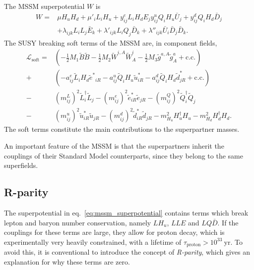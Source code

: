 \documentclass[twoside,english]{uiofysmaster}
\begin{document}
The MSSM superpotential $W$ is
\begin{align}
	W = &\mu H_u H_d + \mu'_i L_i H_u + y_{ij}^e L_i H_d E_j y_{ij}^u Q_i H_u \bar U_j + y_{ij}^d Q_i H_d \bar D_j \label{eq:mssm_superpotential} \\
		&+\lambda_{ijk}L_i L_j \bar E_k + \lambda'_{ijk} L_i Q_j \bar D_k + \lambda''_{ijk} \bar U_i \bar D_j \bar D_k.\nonumber
\end{align} 
The SUSY breaking soft terms of the MSSM are, in component fields,
\begin{align}
	\mathcal{L}_\mathrm{soft} = &\left( -\frac{1}{2}M_1 \tilde B \tilde B - \frac{1}{2}M_2 \tilde W^{i,A} \tilde W^i_A - \frac{1}{2}M_3 \tilde g^{a,A}\tilde g^a_A + \mathrm{c.c.} \right)\nonumber\\
	+ &\left(-a_{ij}^e \tilde L_i H_d {\tilde e^*}_{iR} - a_{ij}^u \tilde Q_i H_u \tilde u^*_{iR} - a_{ij}^d \tilde Q_i H_d \tilde d^*_{jR} + \mathrm{c.c.} \right)\\
	- &(m_{ij}^L)^2 \tilde L_i^\dag \tilde L_j - (m_{ij}^e)^2 {\tilde e_{iR}^*} {\tilde e_{jR}} - (m_{ij}^Q)^2 \tilde Q_i^\dag \tilde Q_j \nonumber \\
	- &(m_{ij}^u)^2 {\tilde u_{iR}^*} {\tilde u_{jR}} - (m_{ij}^d)^2 {\tilde d_{iR}^*} {\tilde d_{jR}} - m^2_{H_u} H^\dag_u H_u - m^2_{H_d} H^\dag_d H_d.\nonumber
\end{align}
The soft terms constitute the main contributions to the superpartner masses. 

An important feature of the MSSM is that the superpartners inherit the couplings of their Standard Model counterparts, since they belong to the same superfields.

\subsection{R-parity}
The superpotential in eq.\ \eqref{eq:mssm_superpotential} contains terms which break lepton and baryon number conservation, namely $LH_u$, $LLE$ and $LQ\bar D$. If the couplings for these terms are large, they allow for proton decay, which is experimentally very heavily constrained, with a lifetime of $\tau_\mathrm{proton} > 10^{33} ~\mathrm{yr}$. To avoid this, it is conventional to introduce the concept of {\it R-parity}, which gives an explanation for why these terms are zero.
\end{document}

